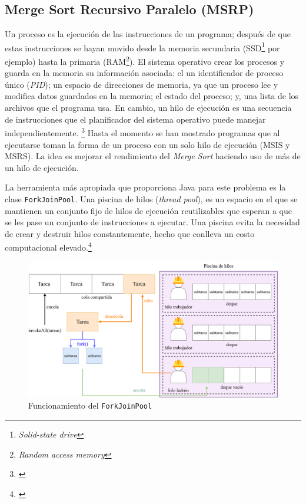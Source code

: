 \documentclass[titlepage]{article}
\begin{document}
\newpage
\subsection{Merge Sort Recursivo Paralelo (MSRP)}
Un proceso es la ejecución de las instrucciones de un programa; después de que estas instrucciones se hayan movido desde la memoria secundaria (SSD\footnote{\textit{Solid-state drive}} por ejemplo) hasta la primaria (RAM\footnote{\textit{Random access memory}}). El sistema operativo crear los procesos y guarda en la memoria su información asociada: el un identificador de proceso único (\textit{PID}); un espacio de direcciones de memoria, ya que un proceso lee y modifica datos guardados en la memoria; el estado del proceso; y, una lista de los archivos que el programa usa. En cambio, un hilo de ejecución es una secuencia de instrucciones que el planificador del sistema operativo puede manejar independientemente. \footnote{\cite{bobrov-2023}} Hasta el momento se han mostrado programas que al ejecutarse toman la forma de un proceso con un solo hilo de ejecución (MSIS y MSRS). La idea es mejorar el rendimiento del \textit{Merge Sort} haciendo uso de más de un hilo de ejecución. 

La herramienta más apropiada que proporciona Java para este problema es la clase \lstinline{ForkJoinPool}.\footnotemark {} Una piscina de hilos (\textit{thread pool}), es un espacio en el que se mantienen un conjunto fijo de hilos de ejecución reutilizables que esperan a que se les pase un conjunto de instrucciones a ejecutar. Una piscina evita la necesidad de crear y destruir hilos constantemente, hecho que conlleva un costo computacional elevado.\footnote{\cite{engle_2022}}

\begin{figure}[h]
	\centering
	\includegraphics[width=0.75\linewidth]{Diagrames/forkJoinPool.png}
	\caption{Funcionamiento del \lstinline{ForkJoinPool}}
	\label{fig:forkJoinPool}
\end{figure}
\end{document}
